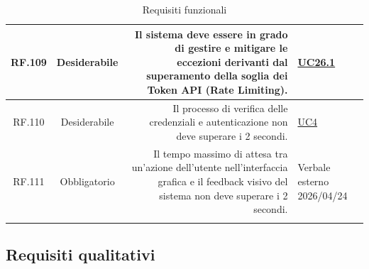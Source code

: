 \documentclass[12pt, a4paper]{article}
\begin{document}
\begin{xltabular}{\textwidth}{|c|c|D|F|}
    RF.109 & Desiderabile & Il sistema deve essere in grado di gestire e mitigare le eccezioni derivanti dal superamento della soglia dei Token API (Rate Limiting). & \hyperref[uc:26.1]{UC26.1} \\ \hline

    RF.110 & Desiderabile & Il processo di verifica delle credenziali e autenticazione non deve superare i 2 secondi. & \hyperref[uc:4]{UC4} \\ \hline

    RF.111 & Obbligatorio & Il tempo massimo di attesa tra un'azione dell'utente nell'interfaccia grafica e il feedback visivo del sistema non deve superare i 2 secondi. & Verbale esterno 2026/04/24 \\ \hline

    \caption{Requisiti funzionali}
    \label{tab:rf}

\end{xltabular}
\endgroup

\newpage
\subsection{Requisiti qualitativi}

\begingroup
\renewcommand{\arraystretch}{1.3}
\end{document}
